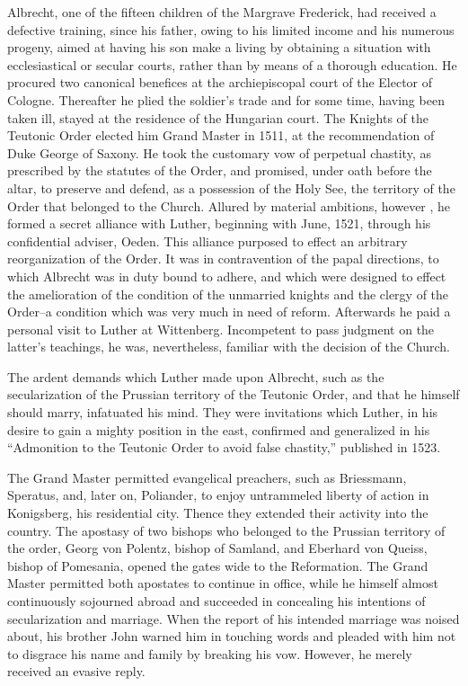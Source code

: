 Albrecht, one of the fifteen children of the Margrave Frederick,
had received a defective training, since his father, owing to his limited
income and his numerous progeny, aimed at having his son make
a living by obtaining a situation with ecclesiastical or secular courts,
rather than by means of a thorough education. He procured two canonical
benefices at the archiepiscopal court of the Elector of Cologne.
Thereafter he plied the soldier’s trade and for some time, having been
taken ill, stayed at the residence of the Hungarian court. The
Knights of the Teutonic Order elected him Grand Master in 1511, at
the recommendation of Duke George of Saxony. He took the customary
vow of perpetual chastity, as prescribed by the statutes of the
Order, and promised, under oath before the altar, to preserve and
defend, as a possession of the Holy See, the territory of the Order
that belonged to the Church. Allured by material ambitions, however
, he formed a secret alliance with Luther, beginning with June,
1521, through his confidential adviser, Oeden. This alliance purposed
to effect an arbitrary reorganization of the Order. It was in
contravention of the papal directions, to which Albrecht was in duty
bound to adhere, and which were designed to effect the amelioration of
the condition of the unmarried knights and the clergy of the
Order--a condition which was very much in need of reform. Afterwards he
paid a personal visit to Luther at Wittenberg. Incompetent
to pass judgment on the latter’s teachings, he was, nevertheless,
familiar with the decision of the Church.

The ardent demands which Luther made upon Albrecht, such as
the secularization of the Prussian territory of the Teutonic Order,
and that he himself should marry, infatuated his mind. They were
invitations which Luther, in his desire to gain a mighty position in
the east, confirmed and generalized in his “Admonition to the Teutonic
Order to avoid false chastity,” published in 1523.

The Grand Master permitted evangelical preachers, such as Briessmann,
Speratus, and, later on, Poliander, to enjoy untrammeled liberty
of action in Konigsberg, his residential city. Thence they extended their
activity into the country. The apostasy of two bishops
who belonged to the Prussian territory of the order, Georg von
Polentz, bishop of Samland, and Eberhard von Queiss, bishop of
Pomesania, opened the gates wide to the Reformation. The Grand
Master permitted both apostates to continue in office, while he himself
almost continuously sojourned abroad and succeeded in concealing
his intentions of secularization and marriage. When the report of his
intended marriage was noised about, his brother John warned him
in touching words and pleaded with him not to disgrace his name
and family by breaking his vow. However, he merely received an
evasive reply.

